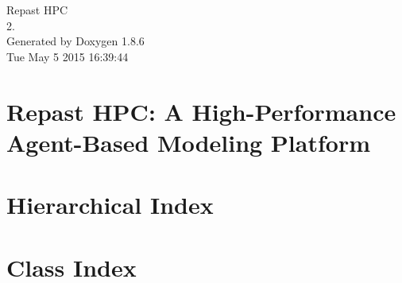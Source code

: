 \documentclass[twoside]{book}
\newcommand{\clearemptydoublepage}{%
  \newpage{\pagestyle{empty}\cleardoublepage}%
}
\begin{document}
\hypersetup{pageanchor=false}
\begin{titlepage}
\vspace*{7cm}
\begin{center}%
{\Large Repast H\-P\-C \\[1ex]\large 2. }\\
\vspace*{1cm}
{\large Generated by Doxygen 1.8.6}\\
\vspace*{0.5cm}
{\small Tue May 5 2015 16:39:44}\\
\end{center}
\end{titlepage}
\clearemptydoublepage
\tableofcontents
\clearemptydoublepage
{}
\hypersetup{pageanchor=true}

\chapter{Repast H\-P\-C\-: A High-\/\-Performance Agent-\/\-Based Modeling Platform}
\label{index}\hypertarget{index}{}
\chapter{Hierarchical Index}

\chapter{Class Index}

\end{document}
